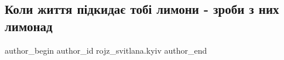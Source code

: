 
 
 
 
 
 
\subsection{Коли життя підкидає тобі лимони - зроби з них лимонад}
\label{sec:09_12_2022.fb.rojz_svitlana.kyiv.1.limony}
 
\ifcmt
 author_begin
   author_id rojz_svitlana.kyiv
 author_end
\fi
